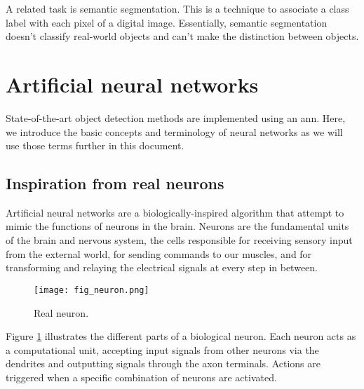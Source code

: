 A related task is semantic segmentation. This is a technique to associate a class label with each pixel of a digital image. Essentially, semantic segmentation doesn't classify real-world objects and can't make the distinction between objects.

\section{Artificial neural networks}
State-of-the-art object detection methods are implemented using an \acrfull{ann}. Here, we introduce the basic concepts and terminology of neural networks as we will use those terms further in this document. 

\subsection{Inspiration from real neurons}
Artificial neural networks are a biologically-inspired algorithm that attempt to mimic the functions of neurons in the brain. Neurons are the fundamental units of the brain and nervous system, the cells responsible for receiving sensory input from the external world, for sending commands to our muscles, and for transforming and relaying the electrical signals at every step in between.
\begin{figure}[ht]
    \texttt{[image: fig\_neuron.png]}
    \caption{Real neuron.}
    \label{fig:neuron}
\end{figure}
Figure \ref{fig:neuron} illustrates the different parts of a biological neuron.
Each neuron acts as a computational unit, accepting input signals from other neurons via the dendrites and outputting signals through the axon terminals. Actions are triggered when a specific combination of neurons are activated.

